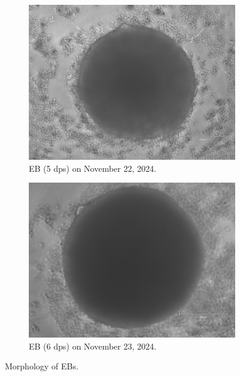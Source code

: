 \documentclass[11pt]{article}
\begin{document}
\begin{figure}[H]
    \vspace{0.3em}
    
    \begin{subfigure}[b]{0.35\textwidth}
        \centering
        \includegraphics[width=\textwidth]{Sandra_eb_PSC_NIM5d0_6F.jpeg}
        \caption{EB (5 dps) on November 22, 2024.}
        \label{fig:Sandra_eb_PSC_NIM5d0_6F}
    \end{subfigure}
    \hfill
    \begin{subfigure}[b]{0.35\textwidth}
        \centering
        \includegraphics[width=\textwidth]{Sandra_eb_PSC_NIM4d2_8H.jpeg}
        \caption{EB (6 dps) on November 23, 2024.}
        \label{fig:Sandra_eb_PSC_NIM4d2_8H}
    \end{subfigure}

    \caption{Morphology of EBs.}
    \label{fig:EB_culture_conditions}
\end{figure}
\end{document}
